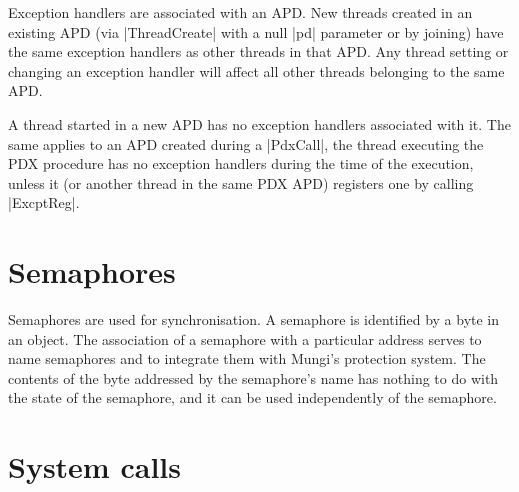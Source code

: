 \documentclass[a4paper,11pt,twoside,dvips]{report}
\begin{document}
Exception handlers are associated with an APD.
New threads created in an existing APD (via |ThreadCreate| with a
null |pd| parameter or by joining) have the same exception handlers as
other threads in that APD. Any thread setting or changing an exception
handler will affect all other threads belonging to the same APD.

A thread started in a new APD has no exception handlers associated with
it. The same applies to an APD created during a |PdxCall|, the thread
executing the PDX procedure has no exception handlers during the time of
the execution, unless it (or another thread in the same PDX APD)
registers one by calling |ExcptReg|.


\section{\label{s:sema}Semaphores}

Semaphores are used for synchronisation. A semaphore is identified by a
byte in an object. The association of a semaphore with a particular
address serves to name semaphores and to integrate them with Mungi's
protection system. The contents of the byte addressed by the semaphore's
name has nothing to do with the state of the semaphore, and it can be
used independently of the semaphore.

\section{\label{s:misc-calls}System calls}
\end{document}
